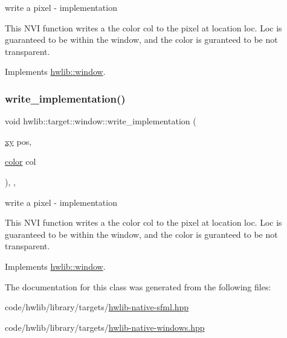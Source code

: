 write a pixel -\/ implementation

This N\+VI function writes a the color col to the pixel at location loc. Loc is guaranteed to be within the window, and the color is guranteed to be not transparent. 

Implements \hyperlink{classhwlib_1_1window}{hwlib\+::window}.

\mbox{\label{classhwlib_1_1target_1_1window_ae432e3dc481e789f5d972331eb1f6725}} 
\subsubsection{\texorpdfstring{write\+\_\+implementation()}{write\_implementation()}\hspace{0.1cm}{\footnotesize\ttfamily [2/2]}}
{\footnotesize\ttfamily void hwlib\+::target\+::window\+::write\+\_\+implementation (\begin{DoxyParamCaption}\item[{\hyperlink{classhwlib_1_1xy}{xy}}]{pos,  }\item[{\hyperlink{classhwlib_1_1color}{color}}]{col }\end{DoxyParamCaption})\hspace{0.3cm}{\ttfamily [inline]}, {\ttfamily [override]}, {\ttfamily [virtual]}}

write a pixel -\/ implementation

This N\+VI function writes a the color col to the pixel at location loc. Loc is guaranteed to be within the window, and the color is guranteed to be not transparent. 

Implements \hyperlink{classhwlib_1_1window}{hwlib\+::window}.



The documentation for this class was generated from the following files\+:\begin{DoxyCompactItemize}
\item 
code/hwlib/library/targets/\hyperlink{hwlib-native-sfml_8hpp}{hwlib-\/native-\/sfml.\+hpp}\item 
code/hwlib/library/targets/\hyperlink{hwlib-native-windows_8hpp}{hwlib-\/native-\/windows.\+hpp}\end{DoxyCompactItemize}
